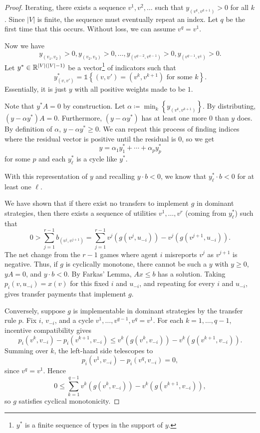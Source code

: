 \begin{proof}
	Iterating, there exists a sequence $v^1,v^2,\ldots$ such that $y_{(v^k, v^{k+1})} > 0$ for all $k$. Since $\left| V \right|$ is finite, the sequence must eventually repeat an index. Let $q$ be the first time that this occurs.
	Without loss, we can assume $v^q= v^1$.

	Now we have \[y_{(v_1,v_2)} > 0, y_{(v_2,v_3)} > 0,\ldots,y_{(v^{q-2},v^{q-1})} > 0, y_{(v^{q-1}, v^{1})} > 0.\]
	Let $y^* \in \mathbb{R}^{\left| V \right|\left( \left| V \right| - 1 \right)}$ be a vector\footnote{$y^*$ is a finite sequence of types in the support of $y$.} of indicators such that \[
		y^*_{(v,v')} = \mathds{1}\left\{\left( v,v' \right) = \left( v^k, v^{k+1} \right)\text{ for some $k$}\right\}
	.\] Essentially, it is just $y$ with all positive weights made to be $1$.

	Note that $y^* A = 0$ by construction. Let $\alpha \coloneqq\min_k \left\{y_{\left( v^k, v^{k+1} \right)}\right\}$.
	By distributing, $(y- \alpha y^*) A = 0$. Furthermore, $(y-\alpha y^*)$ has at least one more $0$ than $y$ does. By definition of $\alpha$, $y-\alpha y^* \ge 0$. We can repeat this process of finding indices where the residual vector is positive until the residual is $0$, so we get \[
		y = \alpha_1 y_1^* + \cdots + \alpha_p y_p^*
	\] for some $p$ and each $y_\ell^*$ is a cycle like $y^*$.

	With this representation of $y$ and recalling $y \cdot b < 0$, we know that $y^*_\ell \cdot b < 0$ for at least one $\ell$. 

	We have shown that if there exist no transfers to implement $g$ in dominant strategies, then there exists a sequence of utilities $v^{1},\ldots,v^{r}$ (coming from $y^*_\ell$) such that \[
		0 > \sum_{j=1}^{r-1} b_{\left( v^j, v^{j+1} \right)} = \sum\limits_{j=1}^{r-1} v^{j}\left( g\left( v^{j},u_{-i} \right) \right) - v^{j}\left( g\left( v^{j+1},u_{-i} \right) \right)
	.\]
	The net change from the $r-1$ games where agent $i$ misreports $v^j$ as $v^{j+1}$ is negative.
	Thus, if $g$ is cyclically monotone, there cannot be such a $y$ with $y \ge 0$, $yA = 0$, and $y \cdot b < 0$. By Farkas' Lemma, $Ax \le b$ has a solution. Taking $p_i(v,u_{-i}) = x(v)$ for this fixed $i$ and $u_{-i}$, and repeating for every $i$ and $u_{-i}$, gives transfer payments that implement $g$.

	Conversely, suppose $g$ is implementable in dominant strategies by the transfer rule $p$. Fix $i$, $v_{-i}$, and a cycle $v^1,\ldots,v^{q-1},v^q = v^1$. For each $k = 1,\ldots,q-1$, incentive compatibility gives \[
		p_i(v^k,v_{-i}) - p_i(v^{k+1},v_{-i}) \le v^k\left( g(v^k,v_{-i}) \right) - v^k\left( g(v^{k+1},v_{-i}) \right)
	.\] 
	Summing over $k$, the left-hand side telescopes to \[
		p_i(v^1,v_{-i}) - p_i(v^q,v_{-i}) = 0
	,\] since $v^q = v^1$. Hence \[
		0 \le \sum\limits_{k=1}^{q-1} v^k\left( g(v^k,v_{-i}) \right) - v^k\left( g(v^{k+1},v_{-i}) \right)
	,\] so $g$ satisfies cyclical monotonicity.
\end{proof}

